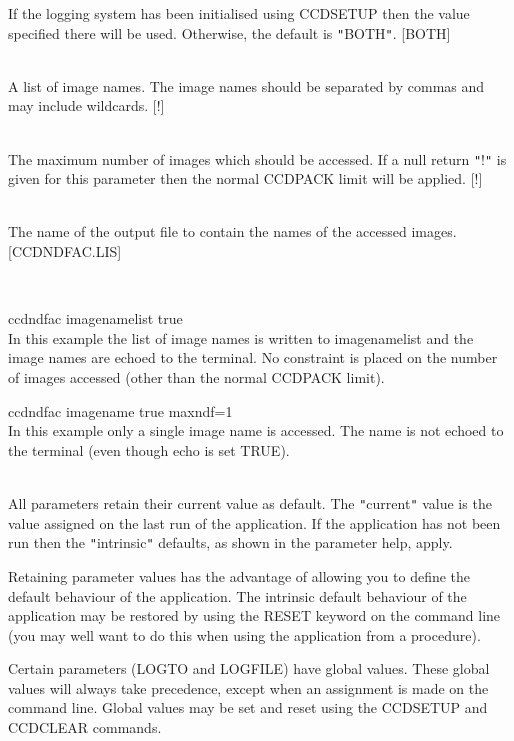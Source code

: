 \documentclass[twoside,11pt]{article}
\newcommand{\htmlref}[2]{#1}
\renewcommand{\_}{\texttt{\symbol{95}}}
\newcommand{\qt}[1]{{\tt "}#1{\tt "}}
\newcommand{\xroutine}[1]{\htmlref{{\sc #1}}{#1}}
\newcommand{\sstexamples}[1]{
   \item[Examples:] \mbox{} \\
   \vspace{-3.5ex}
   \begin{description}
      #1
   \end{description}
}
\newcommand{\sstsubsection}[1]{ \item[{#1}] \mbox{} \\}
\newcommand{\sstexamplesubsection}[2]{\sloppy \item{\ssttt #1} \mbox{} \\ #2 }
\newcommand{\sstdiytopic}[2]{\item[#1:] \mbox{} \\[1.3ex] #2}
\newcommand{\sstexamples}[1]{
      \item[Examples:] \\
      \begin{description}
         #1
      \end{description}
      \\
   }
\newcommand{\sstsubsection}[1]{\item[{#1}]}
\newcommand{\sstexamplesubsection}[2]{\item[{\ssttt #1}] #2}
\newcommand{\sstdiytopic}[2]{\item[{#1:}] #2 }
\begin{document}
{{{{         }
         If the logging system has been initialised using \xroutine{CCDSETUP}
         then the value specified there will be used. Otherwise, the
         default is \qt{BOTH}.
         [BOTH]
      }
      \sstsubsection{
         IN = LITERAL (Read)
      } {
         A list of image names. The image names should be separated
         by commas and may include wildcards.
         [!]
      }
      \sstsubsection{
         MAXNDF = \_INTEGER (Read)
      } {
         The maximum number of images which should be accessed. If a null
         return \qt{!} is given for this parameter then the normal CCDPACK
         limit will be applied.
         [!]
      }
      \sstsubsection{
         NAMELIST = LITERAL (Read)
      } {
         The name of the output file to contain the names of the
         accessed images.
         [CCDNDFAC.LIS]
      }
   }
\newpage
   \sstexamples{
      \sstexamplesubsection{
         ccdndfac image\_name\_list true
      } {
         In this example the list of image names is written to
         image\_name\_list and the image names are echoed to the terminal. No
         constraint is placed on the number of images accessed (other than
         the normal CCDPACK limit).
      }
      \sstexamplesubsection{
         ccdndfac image\_name true maxndf=1
      } {
         In this example only a single image name is accessed. The name is
         not echoed to the terminal (even though echo is set TRUE).
      }
   }
   \sstdiytopic{
      Behaviour of parameters
   } {
      All parameters retain their current value as default. The
      \qt{current} value is the value assigned on the last run of the
      application. If the application has not been run then the
      \qt{intrinsic} defaults, as shown in the parameter help, apply.

      Retaining parameter values has the advantage of allowing you to
      define the default behaviour of the application. The intrinsic
      default behaviour of the application may be restored by using the
      RESET keyword on the command line (you may well want to do this
      when using the application from a procedure).

      Certain parameters (LOGTO and LOGFILE) have global values. These
      global values will always take precedence, except when an
      assignment is made on the command line. Global values may be set
      and reset using the \xroutine{CCDSETUP} and \xroutine{CCDCLEAR} commands.
   }
}
\end{document}
